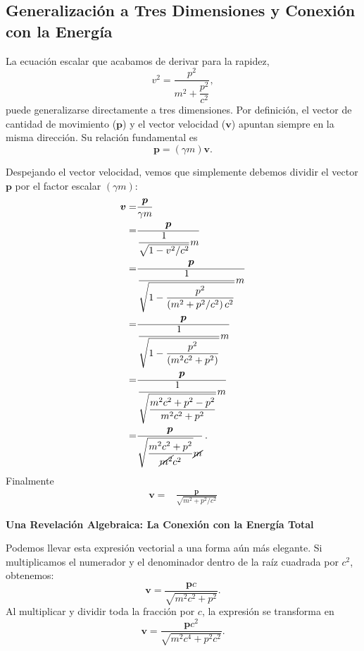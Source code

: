 \documentclass[11pt,a4paper]{book}
\begin{document}
\subsection{Generalización a Tres Dimensiones y Conexión con la Energía}

La ecuación escalar que acabamos de derivar para la rapidez,
\begin{equation}
    v^2 = \frac{p^2}{m^2 + \dfrac{p^2}{c^2}},
\end{equation}
puede generalizarse directamente a tres dimensiones. Por definición, el vector de cantidad de movimiento ($\boldsymbol{p}$) y el vector velocidad ($\boldsymbol{v}$) apuntan siempre en la misma dirección. Su relación fundamental es
\begin{equation}
    \boldsymbol{p} = (\gamma m) \boldsymbol{v}.
\end{equation}

Despejando el vector velocidad, vemos que simplemente debemos dividir el vector $\boldsymbol{p}$ por el factor escalar $(\gamma m)$:
\begin{align}    
    \boldsymbol{v} =& \frac{\boldsymbol{p}}{\gamma m}\nonumber\\
    =&\frac{\boldsymbol{p}}{\dfrac{1}{\sqrt{1-v^2/c^2}} m}\nonumber\\
=&\frac{\boldsymbol{p}}{\dfrac{1}{\sqrt{1-\dfrac{p^2}{\left(m^2+p^2/c^2\right)c^2}}} m}\nonumber\\
=&\frac{\boldsymbol{p}}{\dfrac{1}{\sqrt{1-\dfrac{p^2}{\left(m^2c^2+p^2\right)}}} m}\nonumber\\
=&\frac{\boldsymbol{p}}{\dfrac{1}{\sqrt{\dfrac{m^2c^2+p^2-p^2}{m^2c^2+p^2}}} m}\nonumber\\
=&\frac{\boldsymbol{p}}{\sqrt{\dfrac{m^2c^2+p^2}{\cancel{m^2}c^2}}\cancel{m}}\,.
\end{align}
Finalmente
\begin{align}
\label{eq:velocidadrelativista}
\boldsymbol{v}  =&\frac{\boldsymbol{p}}{\sqrt{m^2+p^2/c^2}}
\end{align}


\textbf{Una Revelación Algebraica: La Conexión con la Energía Total}

Podemos llevar esta expresión vectorial a una forma aún más elegante. Si multiplicamos el numerador y el denominador dentro de la raíz cuadrada por $c^2$, obtenemos:
\begin{equation}
    \boldsymbol{v} = \frac{\boldsymbol{p} c}{\sqrt{m^2 c^2 + p^2}}.
\end{equation}
Al multiplicar y dividir toda la fracción por $c$, la expresión se transforma en
\begin{equation}
    \boldsymbol{v} = \frac{\boldsymbol{p} c^2}{\sqrt{m^2 c^4 + p^2 c^2}}.
\end{equation}
\end{document}
